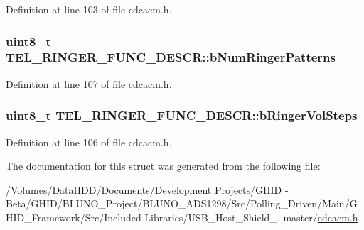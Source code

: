 \-Definition at line 103 of file cdcacm.\-h.

\hypertarget{struct_t_e_l___r_i_n_g_e_r___f_u_n_c___d_e_s_c_r_aca65dc577a0dbc13972da9ab26e25918}{
\subsubsection[{b\-Num\-Ringer\-Patterns}]{\setlength{\rightskip}{0pt plus 5cm}uint8\-\_\-t {\bf \-T\-E\-L\-\_\-\-R\-I\-N\-G\-E\-R\-\_\-\-F\-U\-N\-C\-\_\-\-D\-E\-S\-C\-R\-::b\-Num\-Ringer\-Patterns}}}\label{struct_t_e_l___r_i_n_g_e_r___f_u_n_c___d_e_s_c_r_aca65dc577a0dbc13972da9ab26e25918}


\-Definition at line 107 of file cdcacm.\-h.

\hypertarget{struct_t_e_l___r_i_n_g_e_r___f_u_n_c___d_e_s_c_r_afdbb7ff1b60803569e26718685da9196}{
\subsubsection[{b\-Ringer\-Vol\-Steps}]{\setlength{\rightskip}{0pt plus 5cm}uint8\-\_\-t {\bf \-T\-E\-L\-\_\-\-R\-I\-N\-G\-E\-R\-\_\-\-F\-U\-N\-C\-\_\-\-D\-E\-S\-C\-R\-::b\-Ringer\-Vol\-Steps}}}\label{struct_t_e_l___r_i_n_g_e_r___f_u_n_c___d_e_s_c_r_afdbb7ff1b60803569e26718685da9196}


\-Definition at line 106 of file cdcacm.\-h.



\-The documentation for this struct was generated from the following file\-:\begin{DoxyCompactItemize}
\item 
/\-Volumes/\-Data\-H\-D\-D/\-Documents/\-Development Projects/\-G\-H\-I\-D -\/ Beta/\-G\-H\-I\-D/\-B\-L\-U\-N\-O\-\_\-\-Project/\-B\-L\-U\-N\-O\-\_\-\-A\-D\-S1298/\-Src/\-Polling\-\_\-\-Driven/\-Main/\-G\-H\-I\-D\-\_\-\-Framework/\-Src/\-Included Libraries/\-U\-S\-B\-\_\-\-Host\-\_\-\-Shield\-\_.-\/master/\hyperlink{cdcacm_8h}{cdcacm.\-h}\end{DoxyCompactItemize}
